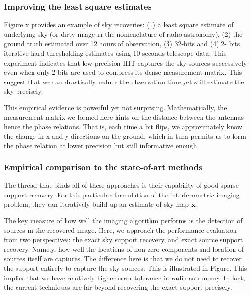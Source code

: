 \documentclass{article}
\begin{document}
\subsubsection{Improving the least square estimates}
Figure x provides an example of sky recoveries: (1) a least square estimate of underlying sky (or dirty image in the nomenclature of radio astronomy), (2) the ground truth estimated over 12 hours of observation, (3) 32-bits and (4) 2- bits iterative hard thresholding estimates using 10 seconds telescope data. This experiment indicates that low precision IHT captures the sky sources successively even when only 2-bits are used to compress its dense measurement matrix. This suggest that we can drastically reduce the observation time yet still estimate the sky precisely.



This empirical evidence is powerful yet not surprising. Mathematically, the measurement matrix we formed here hints on the distance between the antennas hence the phase relations. That is, each time a bit flips, we approximately know the change in x and y directions on the ground, which in turn permits us to form the phase relation at lower precision but still informative enough. 


\subsubsection{Empirical comparison to the state-of-art methods}

The thread that binds all of these approaches is their capability of good sparse support recovery. For this particular formulation of the interferometric imaging problem, they can iteratively build up an estimate of sky map ${\bf x}$.

The key measure of how well the imaging algorithm performs is the detection of sources in the recovered image. Here, we approach the performance evaluation from two perspectives: the exact sky support recovery, and exact source support recovery. Namely, how well the locations of non-zero components and location of sources itself are captures. The difference here is that we do not need to recover the support entirely to capture the sky sources. This is illustrated in Figure. This implies that we have relatively higher error tolerance in radio astronomy. In fact, the current techniques are far beyond recovering the exact support precisely.
\end{document}
